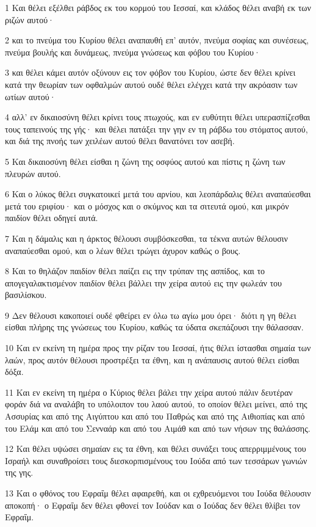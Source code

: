 \par 1 Και θέλει εξέλθει ράβδος εκ του κορμού του Ιεσσαί, και κλάδος θέλει αναβή εκ των ριζών αυτού·
\par 2 και το πνεύμα του Κυρίου θέλει αναπαυθή επ' αυτόν, πνεύμα σοφίας και συνέσεως, πνεύμα βουλής και δυνάμεως, πνεύμα γνώσεως και φόβου του Κυρίου·
\par 3 και θέλει κάμει αυτόν οξύνουν εις τον φόβον του Κυρίου, ώστε δεν θέλει κρίνει κατά την θεωρίαν των οφθαλμών αυτού ουδέ θέλει ελέγχει κατά την ακρόασιν των ωτίων αυτού·
\par 4 αλλ' εν δικαιοσύνη θέλει κρίνει τους πτωχούς, και εν ευθύτητι θέλει υπερασπίζεσθαι τους ταπεινούς της γής· και θέλει πατάξει την γην εν τη ράβδω του στόματος αυτού, και διά της πνοής των χειλέων αυτού θέλει θανατόνει τον ασεβή.
\par 5 Και δικαιοσύνη θέλει είσθαι η ζώνη της οσφύος αυτού και πίστις η ζώνη των πλευρών αυτού.
\par 6 Και ο λύκος θέλει συγκατοικεί μετά του αρνίου, και λεοπάρδαλις θέλει αναπαύεσθαι μετά του εριφίου· και ο μόσχος και ο σκύμνος και τα σιτευτά ομού, και μικρόν παιδίον θέλει οδηγεί αυτά.
\par 7 Και η δάμαλις και η άρκτος θέλουσι συμβόσκεσθαι, τα τέκνα αυτών θέλουσιν αναπαύεσθαι ομού, και ο λέων θέλει τρώγει άχυρον καθώς ο βους.
\par 8 Και το θηλάζον παιδίον θέλει παίζει εις την τρύπαν της ασπίδος, και το απογεγαλακτισμένον παιδίον θέλει βάλλει την χείρα αυτού εις την φωλεάν του βασιλίσκου.
\par 9 Δεν θέλουσι κακοποιεί ουδέ φθείρει εν όλω τω αγίω μου όρει· διότι η γη θέλει είσθαι πλήρης της γνώσεως του Κυρίου, καθώς τα ύδατα σκεπάζουσι την θάλασσαν.
\par 10 Και εν εκείνη τη ημέρα προς την ρίζαν του Ιεσσαί, ήτις θέλει ίστασθαι σημαία των λαών, προς αυτόν θέλουσι προστρέξει τα έθνη, και η ανάπαυσις αυτού θέλει είσθαι δόξα.
\par 11 Και εν εκείνη τη ημέρα ο Κύριος θέλει βάλει την χείρα αυτού πάλιν δευτέραν φοράν διά να αναλάβη το υπόλοιπον του λαού αυτού, το οποίον θέλει μείνει, από της Ασσυρίας και από της Αιγύπτου και από του Παθρώς και από της Αιθιοπίας και από του Ελάμ και από του Σενναάρ και από του Αιμάθ και από των νήσων της θαλάσσης.
\par 12 Και θέλει υψώσει σημαίαν εις τα έθνη, και θέλει συνάξει τους απερριμμένους του Ισραήλ και συναθροίσει τους διεσκορπισμένους του Ιούδα από των τεσσάρων γωνιών της γης.
\par 13 Και ο φθόνος του Εφραΐμ θέλει αφαιρεθή, και οι εχθρευόμενοι του Ιούδα θέλουσιν αποκοπή· ο Εφραΐμ δεν θέλει φθονεί τον Ιούδαν και ο Ιούδας δεν θέλει θλίβει τον Εφραΐμ.
